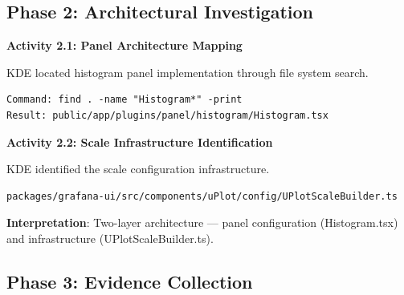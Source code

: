 \documentclass[
    11pt,
    a4paper,
    oneside,
    parskip=full,
    headings=big,
    bibliography=totoc
]{scrartcl}
\begin{document}
\subsection*{Phase 2: Architectural Investigation}

\begin{actionbox}
    \textbf{Activity 2.1: Panel Architecture Mapping}
    
    KDE located histogram panel implementation through file system search.
    
    \vspace{0.3cm}
    \begin{evidencebox}
    \begin{verbatim}
Command: find . -name "Histogram*" -print
Result: public/app/plugins/panel/histogram/Histogram.tsx
    \end{verbatim}
    \end{evidencebox}
\end{actionbox}

\begin{actionbox}
    \textbf{Activity 2.2: Scale Infrastructure Identification}
    
    KDE identified the scale configuration infrastructure.
    
    \vspace{0.3cm}
    \begin{evidencebox}
    \begin{verbatim}
packages/grafana-ui/src/components/uPlot/config/UPlotScaleBuilder.ts
    \end{verbatim}
    \end{evidencebox}
    
    \vspace{0.3cm}
    \textbf{Interpretation}: Two-layer architecture --- panel configuration 
    (Histogram.tsx) and infrastructure (UPlotScaleBuilder.ts).
\end{actionbox}

\subsection*{Phase 3: Evidence Collection}
\end{document}
